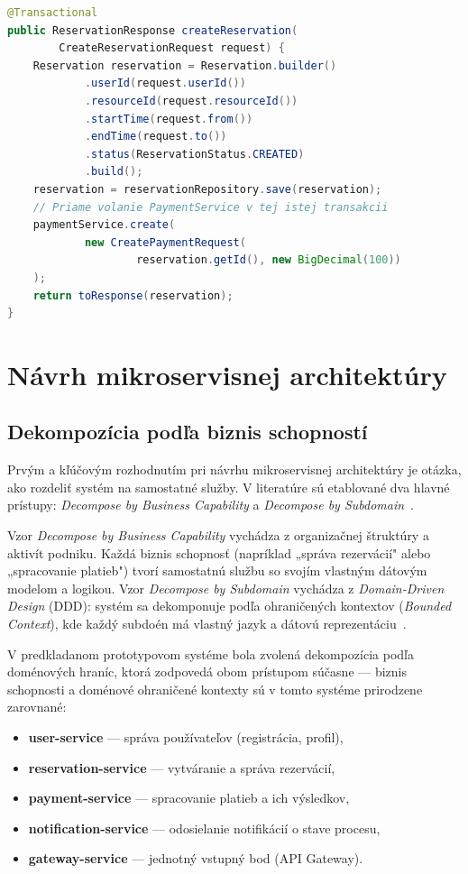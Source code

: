 \begin{lstlisting}[language=Java, breaklines=true, caption={Monolitická verzia -- vytvorenie rezervácie v jednej transakcii (ReservationService.java)}]
@Transactional
public ReservationResponse createReservation(
        CreateReservationRequest request) {
    Reservation reservation = Reservation.builder()
            .userId(request.userId())
            .resourceId(request.resourceId())
            .startTime(request.from())
            .endTime(request.to())
            .status(ReservationStatus.CREATED)
            .build();
    reservation = reservationRepository.save(reservation);
    // Priame volanie PaymentService v tej istej transakcii
    paymentService.create(
            new CreatePaymentRequest(
                    reservation.getId(), new BigDecimal(100))
    );
    return toResponse(reservation);
}
\end{lstlisting}

\section{Návrh mikroservisnej architektúry}

\subsection*{Dekompozícia podľa biznis schopností}

Prvým a kľúčovým rozhodnutím pri návrhu mikroservisnej architektúry je otázka, ako rozdeliť systém na samostatné služby. V literatúre sú etablované dva hlavné prístupy: \emph{Decompose by Business Capability} a \emph{Decompose by Subdomain}~\cite{Richardson2018}.

Vzor \emph{Decompose by Business Capability} vychádza z organizačnej štruktúry a aktivít podniku. Každá biznis schopnosť (napríklad „správa rezervácií" alebo „spracovanie platieb") tvorí samostatnú službu so svojím vlastným dátovým modelom a logikou. Vzor \emph{Decompose by Subdomain} vychádza z \emph{Domain-Driven Design} (DDD): systém sa dekomponuje podľa ohraničených kontextov (\emph{Bounded Context}), kde každý subdoén má vlastný jazyk a dátovú reprezentáciu~\cite{Newman2021}.

V predkladanom prototypovom systéme bola zvolená dekompozícia podľa doménových hraníc, ktorá zodpovedá obom prístupom súčasne — biznis schopnosti a doménové ohraničené kontexty sú v tomto systéme prirodzene zarovnané:

\begin{itemize}
    \item \textbf{user-service} — správa používateľov (registrácia, profil),
    \item \textbf{reservation-service} — vytváranie a správa rezervácií,
    \item \textbf{payment-service} — spracovanie platieb a ich výsledkov,
    \item \textbf{notification-service} — odosielanie notifikácií o stave procesu,
    \item \textbf{gateway-service} — jednotný vstupný bod (API Gateway).
\end{itemize}

